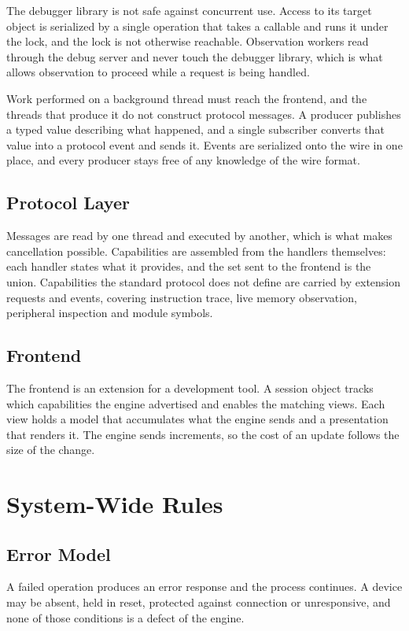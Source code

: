 The debugger library is not safe against concurrent use. Access to its target object is serialized by a single operation that takes a callable and runs it under the lock, and the lock is not otherwise reachable. Observation workers read through the debug server and never touch the debugger library, which is what allows observation to proceed while a request is being handled.

Work performed on a background thread must reach the frontend, and the threads that produce it do not construct protocol messages. A producer publishes a typed value describing what happened, and a single subscriber converts that value into a protocol event and sends it. Events are serialized onto the wire in one place, and every producer stays free of any knowledge of the wire format.

\subsection{Protocol Layer}
Messages are read by one thread and executed by another, which is what makes cancellation possible. Capabilities are assembled from the handlers themselves: each handler states what it provides, and the set sent to the frontend is the union. Capabilities the standard protocol does not define are carried by extension requests and events, covering instruction trace, live memory observation, peripheral inspection and module symbols.

\subsection{Frontend}
The frontend is an extension for a development tool. A session object tracks which capabilities the engine advertised and enables the matching views. Each view holds a model that accumulates what the engine sends and a presentation that renders it. The engine sends increments, so the cost of an update follows the size of the change.

\section{System-Wide Rules}
\label{sec:design_rules}

\subsection{Error Model}
A failed operation produces an error response and the process continues. A device may be absent, held in reset, protected against connection or unresponsive, and none of those conditions is a defect of the engine.

